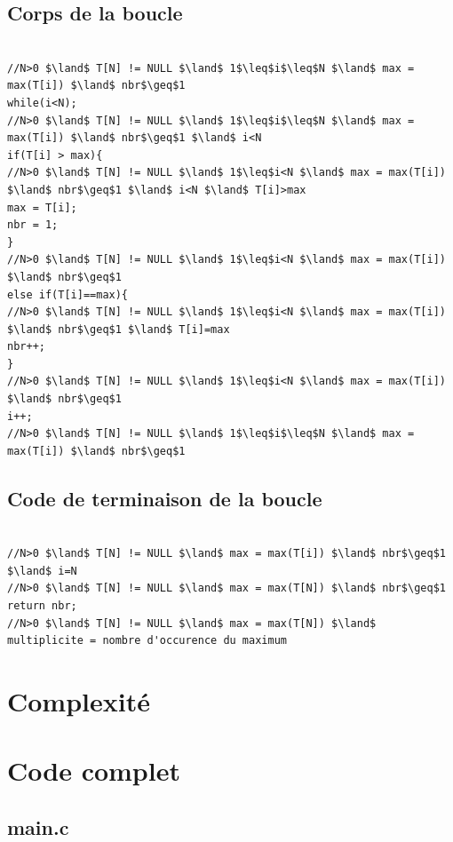 \documentclass[a4paper, 11pt, oneside]{article}
\begin{document}
\subsection{Corps de la boucle}

\begin{lstlisting}[caption={Corps de la boucle}]

//N>0 $\land$ T[N] != NULL $\land$ 1$\leq$i$\leq$N $\land$ max = max(T[i]) $\land$ nbr$\geq$1
while(i<N);
//N>0 $\land$ T[N] != NULL $\land$ 1$\leq$i$\leq$N $\land$ max = max(T[i]) $\land$ nbr$\geq$1 $\land$ i<N
if(T[i] > max){
//N>0 $\land$ T[N] != NULL $\land$ 1$\leq$i<N $\land$ max = max(T[i]) $\land$ nbr$\geq$1 $\land$ i<N $\land$ T[i]>max
max = T[i];
nbr = 1;
}
//N>0 $\land$ T[N] != NULL $\land$ 1$\leq$i<N $\land$ max = max(T[i]) $\land$ nbr$\geq$1
else if(T[i]==max){
//N>0 $\land$ T[N] != NULL $\land$ 1$\leq$i<N $\land$ max = max(T[i]) $\land$ nbr$\geq$1 $\land$ T[i]=max
nbr++;
}
//N>0 $\land$ T[N] != NULL $\land$ 1$\leq$i<N $\land$ max = max(T[i]) $\land$ nbr$\geq$1
i++;
//N>0 $\land$ T[N] != NULL $\land$ 1$\leq$i$\leq$N $\land$ max = max(T[i]) $\land$ nbr$\geq$1

\end{lstlisting}


\subsection{Code de terminaison de la boucle}

\begin{lstlisting}[caption={Code de terminaison de la boucle}]

//N>0 $\land$ T[N] != NULL $\land$ max = max(T[i]) $\land$ nbr$\geq$1 $\land$ i=N
//N>0 $\land$ T[N] != NULL $\land$ max = max(T[N]) $\land$ nbr$\geq$1
return nbr;
//N>0 $\land$ T[N] != NULL $\land$ max = max(T[N]) $\land$ multiplicite = nombre d'occurence du maximum

\end{lstlisting}


\section{Complexité}



\section{Code complet}


\subsection{main.c}
\end{document}

